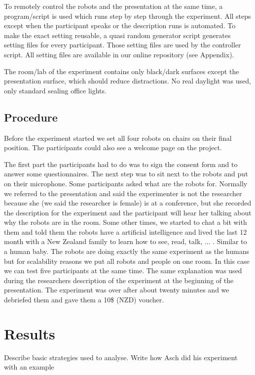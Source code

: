 \documentclass{acm_proc_article-sp}
\begin{document}
To remotely control the robots and the presentation at the same time, a program/script is used which runs step by step through the experiment. All steps except when the participant speaks or the description runs is automated. To make the exact setting reusable, a quasi random generator script generates setting files for every participant. Those setting files are used by the controller script. All setting files are available in our online repository (see Appendix). 

The room/lab of the experiment contains only black/dark surfaces except the presentation surface, which should reduce distractions. No real daylight was used, only standard sealing office lights.


\subsection{Procedure}
Before the experiment started we set all four robots on chairs on their final position. The participants could also see a welcome page on the project. 

The first part the participants had to do was to sign the consent form and to answer some questionnaires. The next step was to sit next to the robots and put on their microphone. Some participants asked what are the robots for. Normally we referred to the presentation and said the experimenter is not the researcher because she (we said the researcher is female) is at a conference, but she recorded the description for the experiment and the participant will hear her talking about why the robots are in the room. Some other times, we started to chat a bit with them and told them the robots have a artificial intelligence and lived the last 12 month with a New Zealand family to learn how to see, read, talk, ... . Similar to a human baby. The robots are doing exactly the same experiment as the humans but for scalability reasons we put all robots and people on one room. In this case we can test five participants at the same time. The same explanation was used during the researchers description of the experiment at the beginning of the presentation. The experiment was over after about twenty minutes and we debriefed them and gave them a 10\$ (NZD) voucher.  


\section{Results}
Describe basic strategies used to analyse. Write how Asch did his experiment with an example
\end{document}
